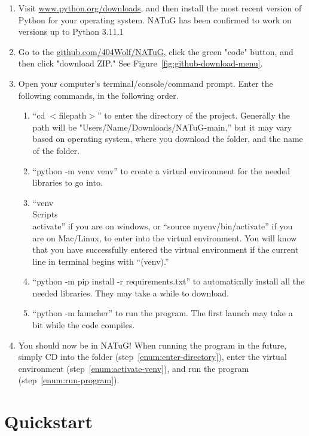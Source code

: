 \documentclass[titlepage]{article}
\begin{document}
	\begin{enumerate} \label{sect:getting-natug-running}
		\item Visit \href{Python's download page}{www.python.org/downloads}, and then install the most recent version of Python for your operating system. NATuG has been confirmed to work on versions up to Python 3.11.1
		\item Go to the \href{NATuG’s Github page}{github.com/404Wolf/NATuG}, click the green "code" button, and then click "download ZIP." See Figure~\ref{fig:github-download-menu}.
		\item Open your computer’s terminal/console/command prompt. Enter the following commands, in the following order. 
		
		\begin{enumerate}
			\item “cd $<$filepath$>$” to enter the directory of the project. Generally the path will be "Users/Name/Downloads/NATuG-main,” but it may vary based on operating system, where you download the folder, and the name of the folder. \label{enum:enter-directory}
			\item “python -m venv venv” to create a virtual environment for the needed libraries to go into.
			\item “venv\\Scripts\\activate” if you are on windows, or “source myenv/bin/activate” if you are on Mac/Linux, to enter into the virtual environment. You will know that you have successfully entered the virtual environment if the current line in terminal begins with “(venv).” \label{enum:activate-venv}
			\item “python -m pip install -r requirements.txt” to automatically install all the needed libraries. They may take a while to download.
			\item “python -m launcher” to run the program. The first launch may take a bit while the code compiles. \label{enum:run-program}
		\end{enumerate}
	
		\item You should now be in NATuG! When running the program in the future, simply CD into the folder (step~\ref{enum:enter-directory}), enter the virtual environment (step~\ref{enum:activate-venv}), and run the program (step~\ref{enum:run-program}).
	\end{enumerate}

	\newpage
	\section{Quickstart}
	
\end{document}
